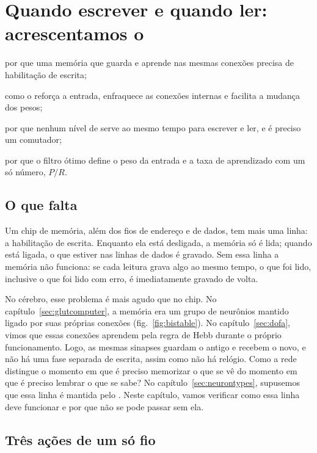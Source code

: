 \chapter{Quando escrever e quando ler: acrescentamos o }
\label{sec:acet}
\begin{chaptergoals}
\item por que uma memória que guarda e aprende nas mesmas conexões precisa de habilitação de escrita;
\item como o  reforça a entrada, enfraquece as conexões internas e facilita a mudança dos pesos;
\item por que nenhum nível de  serve ao mesmo tempo para escrever e ler, e é preciso um comutador;
\item por que o filtro ótimo define o peso da entrada e a taxa de aprendizado com um só número, $P/R$.
\end{chaptergoals}

\section{O que falta}

Um chip de memória, além dos fios de endereço e de dados, tem mais uma linha: a habilitação de escrita. Enquanto ela está desligada, a memória só é lida; quando está ligada, o que estiver nas linhas de dados é gravado. Sem essa linha a memória não funciona: se cada leitura grava algo ao mesmo tempo, o que foi lido, inclusive o que foi lido com erro, é imediatamente gravado de volta.

No cérebro, esse problema é mais agudo que no chip. No capítulo~\ref{sec:glutcomputer}, a memória era um grupo de neurônios  mantido ligado por suas próprias conexões (fig.~\ref{fig:bistable}). No capítulo~\ref{sec:dofa}, vimos que essas conexões aprendem pela regra de Hebb durante o próprio funcionamento. Logo, as mesmas sinapses guardam o antigo e recebem o novo, e não há uma fase separada de escrita, assim como não há relógio. Como a rede distingue o momento em que é preciso memorizar o que se vê do momento em que é preciso lembrar o que se sabe? No capítulo~\ref{sec:neurontypes}, supusemos que essa linha é mantida pelo . Neste capítulo, vamos verificar como essa linha deve funcionar e por que não se pode passar sem ela.

\section{Três ações de um só fio}

